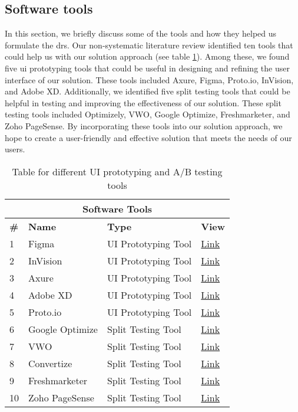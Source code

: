 \subsection*{Software tools}
\label{section:appendix:tools}
In this section, we briefly discuss some of the tools and how they helped us formulate the \ac{dr}s. 
Our non-systematic literature review identified ten tools that could help us with our solution approach (see table \ref{table:appendix:tools:review}). 
Among these, we found five \ac{ui} prototyping tools that could be useful in designing and refining the user interface of our solution. 
These tools included Axure, Figma, Proto.io, InVision, and Adobe XD. 
Additionally, we identified five split testing tools that could be helpful in testing and improving the effectiveness of our solution. 
These split testing tools included Optimizely, VWO, Google Optimize, Freshmarketer, and Zoho PageSense. 
By incorporating these tools into our solution approach, we hope to create a user-friendly and effective solution that meets the needs of our users.
\begin{table}[htbp!]
    \centering
    \begin{tabular}{| m{0.8em} || m{13em} | m{13em} | m{4em} | }
    \hline 
    \multicolumn{4}{|c|}{\textbf{Software Tools}} \\ 
    \hline
    \textbf{\#} & \textbf{Name} & \textbf{Type} & \textbf{View} \\
    \hline
    1 & Figma &  UI Prototyping Tool & \href{https://www.figma.com/}{Link} \\
    \hline 
    2 & InVision &  UI Prototyping Tool & \href{https://www.invisionapp.com/}{Link}\\
    \hline 
    3 & Axure & UI Prototyping Tool & \href{https://www.axure.com/}{Link} \\
    \hline
    4 & Adobe XD & UI Prototyping Tool & \href{https://helpx.adobe.com/support/xd.html}{Link} \\
    \hline
    5 & Proto.io & UI Prototyping Tool & \href{https://proto.io/}{Link} \\
    \hline
    6 & Google Optimize &  Split Testing Tool & \href{https://optimize.google.com/optimize/}{Link} \\
    \hline 
    7 & VWO & Split Testing Tool & \href{https://vwo.com/blog/split-testing/}{Link} \\
    \hline 
    8 & Convertize & Split Testing Tool & \href{https://www.convertize.io/}{Link}\\ 
    \hline 
    9 & Freshmarketer & Split Testing Tool & \href{https://www.freshworks.com/crm/marketing/}{Link} \\
    \hline
    10 & Zoho PageSense & Split Testing Tool & \href{https://www.zoho.com/pagesense/}{Link} \\
    \hline
    \end{tabular}
    \caption[UI prototyping and A/B testing tools]{Table for different UI prototyping and A/B testing tools}
    \label{table:appendix:tools:review}
\end{table}

